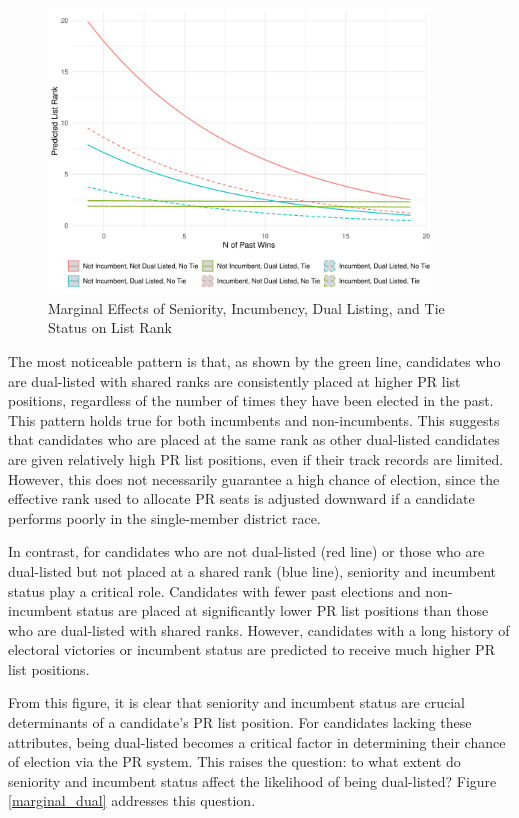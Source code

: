 \documentclass[a4paper, 11pt]{article}
\begin{document}
\begin{figure}[!htbp]
	\includegraphics[width = 0.9\textwidth]{../figure/paper/marginal_effects_rank.pdf}
	\caption{Marginal Effects of Seniority, Incumbency, Dual Listing, and Tie Status on List Rank}
	\label{fig:marginal_rank}
\end{figure}

The most noticeable pattern is that, as shown by the green line, candidates who are dual-listed with shared ranks are consistently placed at higher PR list positions, regardless of the number of times they have been elected in the past. This pattern holds true for both incumbents and non-incumbents. This suggests that candidates who are placed at the same rank as other dual-listed candidates are given relatively high PR list positions, even if their track records are limited. However, this does not necessarily guarantee a high chance of election, since the effective rank used to allocate PR seats is adjusted downward if a candidate performs poorly in the single-member district race.

In contrast, for candidates who are not dual-listed (red line) or those who are dual-listed but not placed at a shared rank (blue line), seniority and incumbent status play a critical role. Candidates with fewer past elections and non-incumbent status are placed at significantly lower PR list positions than those who are dual-listed with shared ranks. However, candidates with a long history of electoral victories or incumbent status are predicted to receive much higher PR list positions.

From this figure, it is clear that seniority and incumbent status are crucial determinants of a candidate’s PR list position. For candidates lacking these attributes, being dual-listed becomes a critical factor in determining their chance of election via the PR system. This raises the question: to what extent do seniority and incumbent status affect the likelihood of being dual-listed? Figure \ref{marginal_dual} addresses this question.
\end{document}
